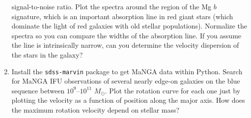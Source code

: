 \begin{enumerate}
signal-to-noise ratio. Plot the spectra around the region of the Mg
$b$ signature, which is an important absorption line in red giant
stars (which dominate the light of red galaxies with old stellar
populations). Normalize the spectra so you can compare the widths of
the absorption line. If you assume the line is intrinsically narrow,
can you determine the velocity dispersion of the stars in the galaxy?
\item Install the {\tt sdss-marvin} package to get MaNGA data within
Python. Search for MaNGA IFU observations of several nearly edge-on
galaxies on the blue sequence between $10^9$--$10^{11}$
$M_\odot$. Plot the rotation curve for each one just by plotting the
velocity as a function of position along the major axis. How does the
maximum rotation velocity depend on stellar mass?
\end{enumerate}


  
